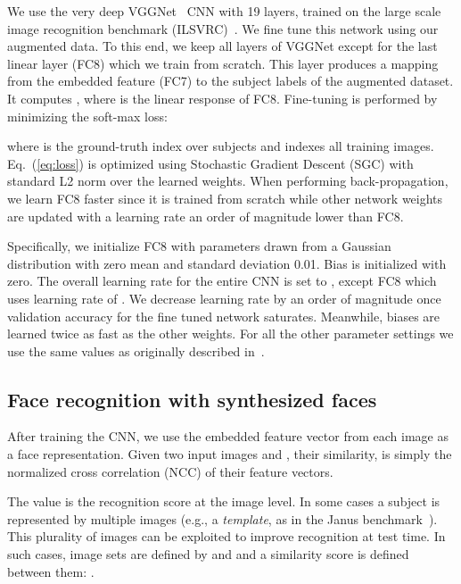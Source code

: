 \documentclass[runningheads]{llncs}
\newcommand{\minisection}[1]{\vspace{0.04in} \noindent {\bf #1:} }
\begin{document}
\minisection{CNN fine-tuning}\label{sec:finetune}
We use the very deep VGGNet~\cite{Simonyan2015very} CNN with 19 layers, trained on the large scale image recognition benchmark (ILSVRC)~\cite{russakovsky2014imagenet}. We fine tune this network using our augmented data. To this end, we keep all layers  of VGGNet except for the last linear layer (FC8) which we train from scratch. This layer produces a mapping from the embedded feature  (FC7) to the subject labels  of the augmented dataset. It  computes , where  is the linear response of FC8. Fine-tuning is performed by minimizing the soft-max loss:

where  is the ground-truth index over  subjects and  indexes all training images. Eq.~(\ref{eq:loss}) is optimized using Stochastic Gradient Descent (SGC) with standard L2 norm over the learned weights. When performing back-propagation, we learn FC8 faster since it is trained from scratch while other network weights are updated with a learning rate an order of magnitude lower than FC8. 

Specifically, we initialize FC8 with parameters drawn from a Gaussian distribution with zero mean and standard deviation 0.01. Bias is initialized with zero. The overall learning rate  for the entire CNN is set to , except FC8 which uses learning rate of . We decrease learning rate by an order of magnitude once validation accuracy for the fine tuned network saturates.  Meanwhile, biases are learned twice as fast as the other weights. For all the other parameter settings we use the same values as originally described in~\cite{krizhevsky2012imagenet}.


\subsection{Face recognition with synthesized faces}\label{sec:matching}

\minisection{General matching process}\label{sec:generalMatch}
After training the CNN, we use the embedded feature vector  
from each image  as a face representation. Given two input images  and , their similarity,  is simply the normalized cross correlation (NCC) of their feature vectors. 



The value  is the recognition score at the image level. In some cases a subject is represented by multiple images (e.g., a {\em template}, as in the Janus benchmark~\cite{klare2015pushing}). This plurality of images can be exploited to improve recognition at test time. In such cases, image sets are defined by  and  and a similarity score is defined between them: .
\end{document}
